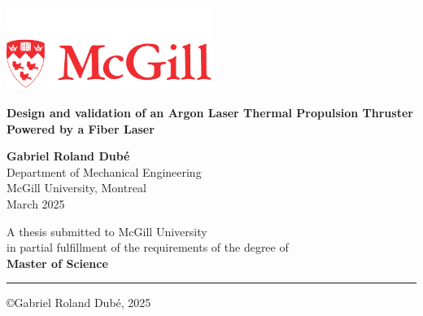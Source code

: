 \begin{titlepage}
  \thispagestyle{empty}
  \sffamily
  \begin{center}
    \includegraphics[width=0.5\textwidth]{assets/McGill_logo.pdf} \\
    \vspace*{2cm}
    
    \huge
    \textbf{Design and validation of an Argon Laser Thermal Propulsion Thruster Powered by a Fiber Laser}
    
    \large

    
    \vspace{1.5cm}    
    \textbf{Gabriel Roland Dubé}\\

    
    \vspace{0.5cm}
    Department of Mechanical Engineering\\
    McGill University, Montreal\\

    \vspace{1.5cm}
    March 2025\\
    \vspace{1.5cm}
    
    A thesis submitted to McGill University \\
    in partial fulfillment of the requirements of the degree of\\
    \textbf{Master of Science}\\
    
    \vfill

    {\color{red}\hrule}

    \copyright Gabriel Roland Dubé, 2025
            
  \end{center}
\end{titlepage}